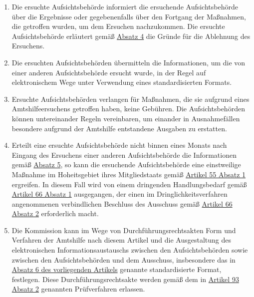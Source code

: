 \begin{enumerate}
\begin{enumerate}
  \end{enumerate}

  \item Die ersuchte Aufsichtsbehörde informiert die ersuchende Aufsichtsbehörde über die Ergebnisse oder gegebenenfalls
   über den Fortgang der Maßnahmen, die getroffen wurden, um dem Ersuchen nachzukommen. Die ersuchte Aufsichtsbehörde
   erläutert gemäß \hyperref[itm:61-4]{Absatz 4} die Gründe für die Ablehnung des Ersuchens.
  \label{itm:61-5}

  \item Die ersuchten Aufsichtsbehörden übermitteln die Informationen, um die von einer anderen Aufsichtsbehörde ersucht
   wurde, in der Regel auf elektronischem Wege unter Verwendung eines standardisierten Formats.
  \label{itm:61-6}

  \item Ersuchte Aufsichtsbehörden verlangen für Maßnahmen, die sie aufgrund eines Amtshilfeersuchens getroffen haben,
   keine Gebühren. Die Aufsichtsbehörden können untereinander Regeln vereinbaren, um einander in Ausnahmefällen
   besondere aufgrund der Amtshilfe entstandene Ausgaben zu erstatten.
  \label{itm:61-7}

  \item Erteilt eine ersuchte Aufsichtsbehörde nicht binnen eines Monats nach Eingang des Ersuchens einer anderen
   Aufsichtsbehörde die Informationen gemäß \hyperref[itm:61-5]{Absatz 5}, so kann die ersuchende Aufsichtsbehörde eine
   einstweilige Maßnahme im Hoheitsgebiet ihres Mitgliedstaats gemäß \hyperref[itm:55-1]{Artikel 55 Absatz 1}
   ergreifen. In diesem Fall wird von einem dringenden Handlungsbedarf gemäß \hyperref[itm:66-1]{Artikel 66 Absatz 1}
   ausgegangen, der einen im Dringlichkeitsverfahren angenommenen verbindlichen Beschluss des Ausschuss gemäß \hyperref
   [itm:66-2]{Artikel 66 Absatz 2} erforderlich macht.
  \label{itm:61-8}

  \item Die Kommission kann im Wege von Durchführungsrechtsakten Form und Verfahren der Amtshilfe nach diesem Artikel
   und die Ausgestaltung des elektronischen Informationsaustauschs zwischen den Aufsichtsbehörden sowie zwischen den
   Aufsichtsbehörden und dem Ausschuss, insbesondere das in \hyperref[itm:61-1]{Absatz 6 des vorliegenden Artikels}
   genannte standardisierte Format, festlegen. Diese Durchführungsrechtsakte werden gemäß dem in \hyperref[itm:93-2]
   {Artikel 93 Absatz 2} genannten Prüfverfahren erlassen.
  \label{itm:61-7}

\end{enumerate}


